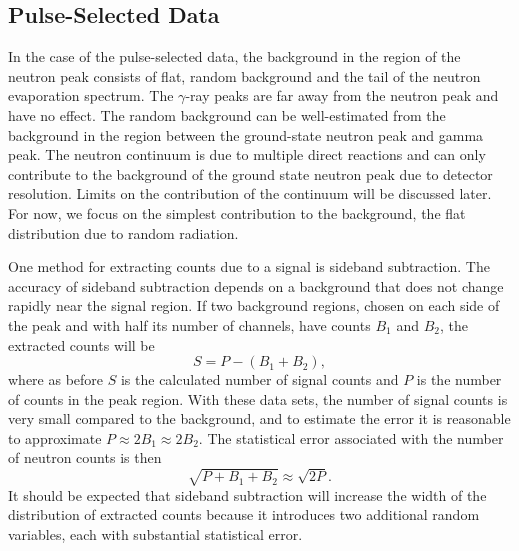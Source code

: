 \subsection{Pulse-Selected Data}
In the case of the pulse-selected data, the background in the region of the neutron peak consists of flat, random background and the tail of the neutron evaporation spectrum.  The $\gamma$-ray peaks are far away from the neutron peak and have no effect.  The random background can be well-estimated from the background in the region between the ground-state neutron peak and gamma peak.  The neutron continuum is due to multiple direct reactions and can only contribute to the background of the ground state neutron peak due to detector resolution.  Limits on the contribution of the continuum will be discussed later.  For now, we focus on the simplest contribution to the background, the flat distribution due to random radiation.

One method for extracting counts due to a signal is sideband subtraction.  The accuracy of sideband subtraction depends on a background that does not change rapidly near the signal region.  If two background regions, chosen on each side of the peak and with half its number of channels, have counts $B_1$ and $B_2$, the extracted counts will be
\begin{equation}
S = P - (B_1 + B_2),
\end{equation}
where as before $S$ is the calculated number of signal counts and $P$ is the number of counts in the peak region.  With these data sets, the number of signal counts is very small compared to the background, and to estimate the error it is reasonable to approximate $P \approx 2 B_1 \approx 2 B_2$.  The statistical error associated with the number of neutron counts is then
\begin{equation}
\sqrt{P + B_1 + B_2} \approx \sqrt{2 P}.
\end{equation}
It should be expected that sideband subtraction will increase the width of the distribution of extracted counts because it introduces two additional random variables, each with substantial statistical error.  

